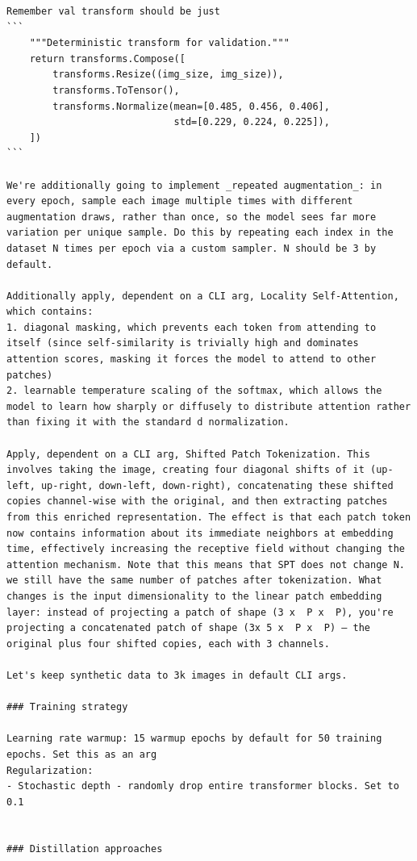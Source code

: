\documentclass[11pt]{article}
\begin{document}
\begin{enumerate}
\begin{verbatim}
Remember val transform should be just
```
    """Deterministic transform for validation."""
    return transforms.Compose([
        transforms.Resize((img_size, img_size)),
        transforms.ToTensor(),
        transforms.Normalize(mean=[0.485, 0.456, 0.406],
                             std=[0.229, 0.224, 0.225]),
    ])
```

We're additionally going to implement _repeated augmentation_: in every epoch, sample each image multiple times with different augmentation draws, rather than once, so the model sees far more variation per unique sample. Do this by repeating each index in the dataset N times per epoch via a custom sampler. N should be 3 by default.

Additionally apply, dependent on a CLI arg, Locality Self-Attention, which contains:
1. diagonal masking, which prevents each token from attending to itself (since self-similarity is trivially high and dominates attention scores, masking it forces the model to attend to other patches)
2. learnable temperature scaling of the softmax, which allows the model to learn how sharply or diffusely to distribute attention rather than fixing it with the standard d normalization.

Apply, dependent on a CLI arg, Shifted Patch Tokenization. This involves taking the image, creating four diagonal shifts of it (up-left, up-right, down-left, down-right), concatenating these shifted copies channel-wise with the original, and then extracting patches from this enriched representation. The effect is that each patch token now contains information about its immediate neighbors at embedding time, effectively increasing the receptive field without changing the attention mechanism. Note that this means that SPT does not change N. we still have the same number of patches after tokenization. What changes is the input dimensionality to the linear patch embedding layer: instead of projecting a patch of shape (3 x  P x  P), you're projecting a concatenated patch of shape (3x 5 x  P x  P) — the original plus four shifted copies, each with 3 channels.

Let's keep synthetic data to 3k images in default CLI args. 

### Training strategy

Learning rate warmup: 15 warmup epochs by default for 50 training epochs. Set this as an arg
Regularization:
- Stochastic depth - randomly drop entire transformer blocks. Set to 0.1


### Distillation approaches


\end{verbatim}
\end{enumerate}
\end{document}
